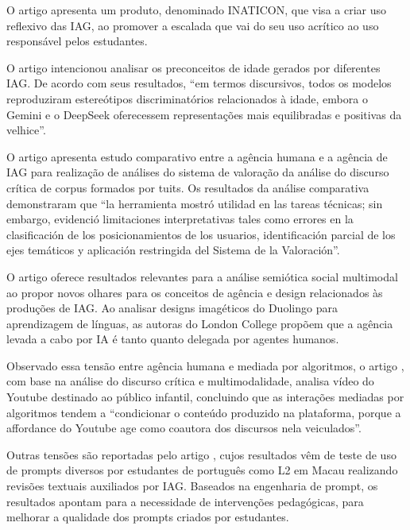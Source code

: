 \documentclass[portuguese]{textolivre}
\begin{document}
O artigo  apresenta um produto, denominado INATICON, que visa a criar uso reflexivo das IAG, ao promover a escalada que vai do seu uso acrítico ao uso responsável pelos estudantes.

O artigo  intencionou analisar os preconceitos de idade gerados por diferentes IAG. De acordo com seus resultados, “em termos discursivos, todos os modelos reproduziram estereótipos discriminatórios relacionados à idade, embora o Gemini e o DeepSeek oferecessem representações mais equilibradas e positivas da velhice”.

O artigo  apresenta estudo comparativo entre a agência humana e a agência de IAG para realização de análises do sistema de valoração da análise do discurso crítica de corpus formados por tuits. Os resultados da análise comparativa demonstraram que “la herramienta mostró utilidad en las tareas técnicas; sin embargo, evidenció limitaciones interpretativas tales como errores en la clasificación de los posicionamientos de los usuarios, identificación parcial de los ejes temáticos y aplicación restringida del Sistema de la Valoración”.

O artigo  oferece resultados relevantes para a análise semiótica social multimodal ao propor novos olhares para os conceitos de agência e design relacionados às produções de IAG. Ao analisar designs imagéticos do Duolingo para aprendizagem de línguas, as autoras do London College propõem que a agência levada a cabo por IA é tanto quanto delegada por agentes humanos. 

Observado essa tensão entre agência humana e mediada por algoritmos, o artigo , com base na análise do discurso crítica e multimodalidade, analisa vídeo do Youtube destinado ao público infantil, concluindo que as interações mediadas por algoritmos tendem a “condicionar o conteúdo produzido na plataforma, porque a affordance do Youtube age como coautora dos discursos nela veiculados”.

Outras tensões são reportadas pelo artigo , cujos resultados vêm de teste de uso de prompts diversos por estudantes de português como L2 em Macau realizando revisões textuais auxiliados por IAG. Baseados na engenharia de prompt, os resultados apontam para a necessidade de intervenções pedagógicas, para melhorar a qualidade dos prompts criados por estudantes.
\end{document}
